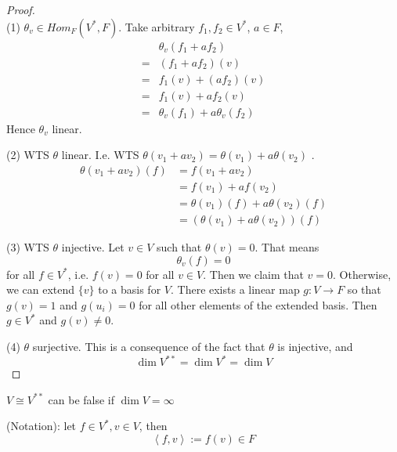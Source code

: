 \begin{proof}
    \\
    (1) $\theta_v \in Hom_F(V^*, F)$. Take arbitrary $f_1, f_2 \in V^*$, $a \in F$, 
    \begin{align*}
        &\theta_v(f_1 + af_2) \\
        =& \left( f_1 + af_2 \right)(v) \\
        =& f_1(v) + (af_2)(v) \\
        =&  f_1(v) + af_2(v) \\
        =& \theta_v(f_1) + a\theta_v(f_2)
    \end{align*}
    Hence $ \theta_v$ linear. 

    (2) WTS $ \theta$ linear. I.e. WTS $ \theta (v_1 + av_2)= \theta(v_1) + a \theta(v_2)$ . \\

    \begin{align*}
        \theta (v_1 + av_2) (f) &= f \left( v_1 + av_2 \right)  \\
        &= f(v_1) + a f(v_2) \\
        &= \theta(v_1)(f) + a \theta(v_2) (f) \\
        &= \left( \theta(v_1) + a \theta (v_2) \right)  (f)
    \end{align*}

    (3) WTS $ \theta$ injective. Let $v \in V$ such that $ \theta(v) = 0$. That means 
    \[
        \theta_v(f) = 0 
    \]
    for all $f \in V^*$, i.e. $f(v) = 0 $ for all $v \in V$. Then we claim that $v = 0$. Otherwise, we can extend $ \{ v \} $ to a basis for $V$. There exists a linear map $g: V \to F$ so that $g(v) = 1$ and $g(u_i) = 0$ for all other elements of the extended basis. Then $g \in V^*$ and $g(v) \neq 0$. 

    (4) $\theta$ surjective. This is a consequence of the fact that $\theta $ is injective, and 
    \[
        \dim V^{**} = \dim V^* = \dim V
    \]
\end{proof}

\begin{remark}
    $V \cong V^{**}$ can be false if $\dim V = \infty$
\end{remark}

\begin{remark}(Notation): let $f \in V^*, v \in V$, then 
    \[
        \left<f, v\right> := f(v) \in F
    \]
\end{remark}



